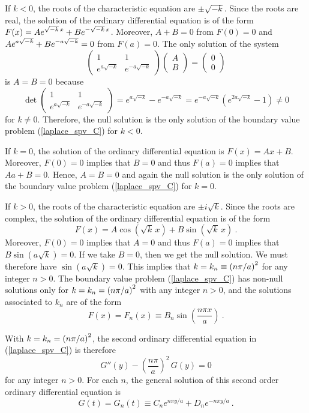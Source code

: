 \begin{egg}
If $k<0$, the roots of the characteristic equation are $\pm \sqrt{-k}$.
Since the roots are real, the solution of the ordinary differential
equation is of the form
$\displaystyle F(x) = A e^{\sqrt{-k}\,x} + B e^{-\sqrt{-k}\, x}$.
Moreover, $A+B=0$ from $F(0)=0$ and 
$\displaystyle A e^{a\sqrt{-k}} + B e^{-a\sqrt{-k}} = 0$ from $F(a)=0$.
The only solution of the system
\[
\begin{pmatrix}
1 & 1 \\ e^{a\sqrt{-k}} & e^{-a\sqrt{-k}}
\end{pmatrix}
\begin{pmatrix}
A \\ B
\end{pmatrix}
=
\begin{pmatrix}
0 \\ 0 
\end{pmatrix}
\]
is $A=B=0$ because
\[
\det
\begin{pmatrix}
1 & 1 \\ e^{a\sqrt{-k}} & e^{-a\sqrt{-k}}
\end{pmatrix}
= e^{a\sqrt{-k}} - e^{-a\sqrt{-k}} =
e^{-a\sqrt{-k}}\left(e^{2a\sqrt{-k}} - 1 \right)  
\neq 0
\]
for $k\neq 0$.  Therefore, the null solution is the only solution
of the boundary value problem (\ref{laplace_spv_C}) for $k<0$.

If $k=0$, the solution of the ordinary differential equation is $F(x)=Ax+B$.
Moreover, $F(0)=0$ implies that $B=0$ and thus $F(a)=0$ implies
that $Aa + B = 0$.  Hence, $A=B=0$ and again the null solution is the
only solution of the boundary value problem (\ref{laplace_spv_C}) for
$k=0$.

If $k>0$, the roots of the characteristic equation are $\pm i \sqrt{k}$.
Since the roots are complex, the solution of the ordinary differential
equation is of the form
\[
F(x) = A \cos\left(\sqrt{k}\,x\right) + B \sin\left(\sqrt{k}\,x\right) \ .
\]
Moreover, $F(0)=0$ implies that $A=0$ and thus $F(a)=0$ implies that
$B \sin\left(a\sqrt{k}\right) = 0$.  If we take $B=0$, then we get the
null solution.  We must therefore have
$\sin\left(a\sqrt{k}\right) = 0$.  This implies that
$\displaystyle k = k_n \equiv \left(n\pi/a\right)^2$ for any integer $n>0$.
The boundary value problem
(\ref{laplace_spv_C}) has non-null solutions only for
$\displaystyle k = k_n = \left(n\pi/a\right)^2$ with
any integer $n>0$, and the solutions associated to $k_n$ are of the
form
\[
F(x)=F_n(x) \equiv B_n \sin\left(\frac{n\pi x}{a}\right) \ .
\]

With $\displaystyle k = k_n = \left(n\pi/a\right)^2$, the second
ordinary differential equation in (\ref{laplace_spv_C}) is therefore
\[
G''(y) - \left(\frac{n\pi}{a}\right)^2\,G(y) = 0
\]
for any integer $n>0$.  For each $n$, the general solution
of this second order ordinary differential equation is
\[
G(t) = G_n(t) \equiv C_n e^{n\pi y/a} + D_n e^{-n\pi y/a} \ .
\]


\end{egg}
